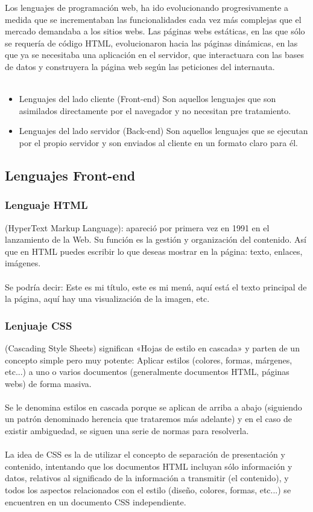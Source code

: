 \begin{large}
Los lenguajes de programación web, ha ido evolucionando progresivamente a medida que se incrementaban las funcionalidades cada vez más complejas que el mercado demandaba a los sitios webs. Las páginas webs estáticas, en las que sólo se requería de código HTML, evolucionaron hacia las páginas dinámicas, en las que ya se necesitaba una aplicación en el servidor, que interactuara con las bases de datos y construyera la página web según las peticiones del internauta.
\\
\\
\begin{itemize}
\item Lenguajes del lado cliente (Front-end)
    Son aquellos lenguajes que son asimilados directamente por el navegador y no necesitan pre tratamiento.
\item Lenguajes del lado servidor (Back-end)
    Son aquellos lenguajes que se ejecutan por el propio servidor y son enviados al cliente en un formato claro para él.
\end{itemize}\leavevmode

\subsection{Lenguajes Front-end}

\subsubsection{Lenguaje HTML} 
(HyperText Markup Language): apareció por primera vez en 1991 en el lanzamiento de la Web. Su función es la gestión y organización del contenido. Así que en HTML puedes escribir lo que deseas mostrar en la página: texto, enlaces, imágenes.
\\
\\
Se podría decir: Este es mi título, este es mi menú, aquí está el texto principal de la página, aquí hay una visualización de la imagen, etc.
\\
\subsubsection{Lenjuaje CSS}

(Cascading Style Sheets) significan «Hojas de estilo en cascada» y parten de un concepto simple pero muy potente: Aplicar estilos (colores, formas, márgenes, etc...) a uno o varios documentos (generalmente documentos HTML, páginas webs) de forma masiva.
\\
\\
Se le denomina estilos en cascada porque se aplican de arriba a abajo (siguiendo un patrón denominado herencia que trataremos más adelante) y en el caso de existir ambiguedad, se siguen una serie de normas para resolverla.
\\
\\
La idea de CSS es la de utilizar el concepto de separación de presentación y contenido, intentando que los documentos HTML incluyan sólo información y datos, relativos al significado de la información a transmitir (el contenido), y todos los aspectos relacionados con el estilo (diseño, colores, formas, etc...) se encuentren en un documento CSS independiente.
\\

\end{large}
